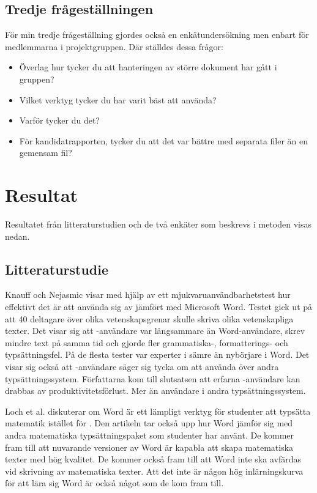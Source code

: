 \subsection{Tredje frågeställningen}

För min tredje frågeställning gjordes också en enkätundersökning men enbart för medlemmarna i projektgruppen. Där ställdes dessa frågor:
\begin{itemize}
	\item Överlag hur tycker du att hanteringen av större dokument har gått i gruppen?
	\item Vilket verktyg tycker du har varit bäst att använda?
	\item Varför tycker du det?
	\item För kandidatrapporten, tycker du att det var bättre med separata filer än en gemensam fil?
\end{itemize}

\section{Resultat}
\label{sec:results-tuhkala}
Resultatet från litteraturstudien och de två enkäter som beskrevs i metoden visas nedan.

\subsection{Litteraturstudie}
Knauff och Nejasmic \cite{knauff2014efficiency} visar med hjälp av ett mjukvaruanvändbarhetstest hur effektivt det är att använda sig av \latex jämfört med Microsoft Word. Testet gick ut på att 40 deltagare över olika vetenskapsgrenar skulle skriva olika vetenskapliga texter.
Det visar sig att \latex-användare var långsammare än Word-användare, skrev mindre text på samma tid och gjorde fler grammatiska-, formatterings- och typsättningsfel. På de flesta tester var experter i \latex sämre än nybörjare i Word. Det visar sig också att \latex-användare säger sig tycka om att använda \latex över andra typsättningssystem. Författarna kom till slutsatsen att erfarna \latex-användare kan drabbas av produktivitetsförlust. Mer än användare i andra typsättningssystem.

Loch et al. \cite{loch2014master} diskuterar om Word är ett lämpligt verktyg för studenter att typsätta matematik istället för \latex. Den artikeln tar också upp hur Word jämför sig med andra matematiska typsättningspaket som studenter har använt. De kommer fram till att nuvarande versioner av Word är kapabla att skapa matematiska texter med hög kvalitet. De kommer också fram till att Word inte ska avfärdas vid skrivning av matematiska texter. Att det inte är någon hög inlärningskurva för att lära sig Word är också något som de kom fram till.

